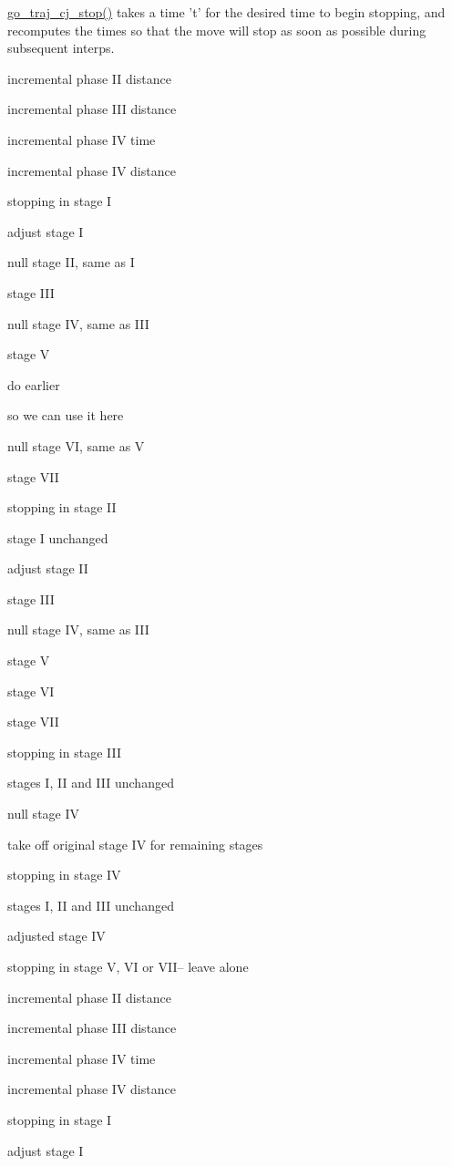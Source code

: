\hyperlink{namespacegomotion_a0764efa1b4a4385aaf9fe13e0ea7b812}{go\-\_\-traj\-\_\-cj\-\_\-stop()} takes a time 't' for the desired time to begin stopping, and recomputes the times so that the move will stop as soon as possible during subsequent interps. 

incremental phase I\-I distance

incremental phase I\-I\-I distance

incremental phase I\-V time

incremental phase I\-V distance

stopping in stage I

adjust stage I

null stage I\-I, same as I

stage I\-I\-I

null stage I\-V, same as I\-I\-I

stage V

do earlier

so we can use it here

null stage V\-I, same as V

stage V\-I\-I

stopping in stage I\-I

stage I unchanged

adjust stage I\-I

stage I\-I\-I

null stage I\-V, same as I\-I\-I

stage V

stage V\-I

stage V\-I\-I

stopping in stage I\-I\-I

stages I, I\-I and I\-I\-I unchanged

null stage I\-V

take off original stage I\-V for remaining stages

stopping in stage I\-V

stages I, I\-I and I\-I\-I unchanged

adjusted stage I\-V

stopping in stage V, V\-I or V\-I\-I-- leave alone

incremental phase I\-I distance

incremental phase I\-I\-I distance

incremental phase I\-V time

incremental phase I\-V distance

stopping in stage I

adjust stage I

